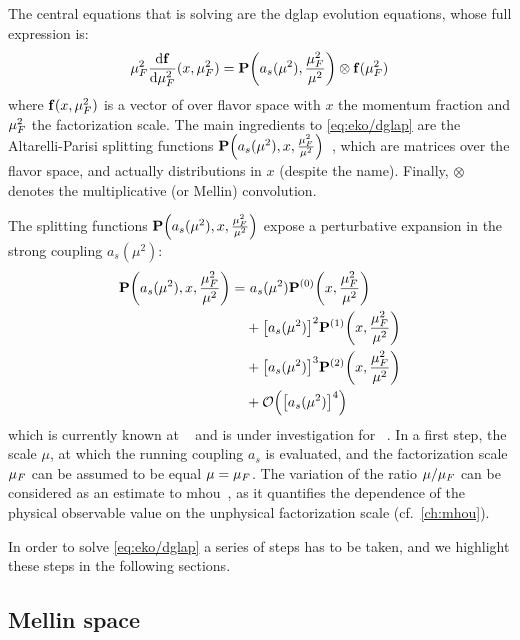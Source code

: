 
The central equations that \eko is solving are the \acrfull{dglap} evolution
equations, whose full expression is:
\begin{equation}
  \muF^2 \dv{\vb f}{\muF^2}{}(x,\muF^2) = \vb P\qty(a_s(\mu^2),\frac{\muF^2}{\mu^2}) \otimes \vb f(\muF^2)
	\label{eq:eko/dglap}
\end{equation}
where $\vb f(x,\mu_F^2)$ is a vector of \pdfs over flavor space with $x$ the
momentum fraction and $\mu_F^2$ the factorization scale. The main ingredients to
\cref{eq:eko/dglap} are the Altarelli-Parisi splitting functions $\vb
P\qty(a_s(\mu^2),x,\frac{\mu_F^2}{\mu^2})$~\cite{Moch:2004pa,Vogt:2004mw}, which
are matrices over the flavor space, and actually distributions in $x$ (despite
the name).
Finally, $\otimes$ denotes the multiplicative (or Mellin) convolution.

The splitting functions $\vb P\qty(a_s(\mu^2),x,\frac{\mu_F^2}{\mu^2})$ expose a
perturbative expansion in the strong coupling $a_s(\mu^2)$:
\begin{align}
  \vb P\qty(a_s(\mu^2),x,\frac{\muF^2}{\mu^2}) =
  &~ a_s(\mu^2) \vb P^{(0)}\qty(x,\frac{\muF^2}{\mu^2})\nonumber\\
  &+ \qty[a_s(\mu^2)]^2 \vb P^{(1)}\qty(x,\frac{\muF^2}{\mu^2})\nonumber\\
  &+ \qty[a_s(\mu^2)]^3 \vb P^{(2)}\qty(x,\frac{\muF^2}{\mu^2})\nonumber\\
  &+ \order{\qty[a_s(\mu^2)]^4}
\end{align}
which is currently known at \nnlo{}~\cite{Moch:2004pa,Vogt:2004mw,Blumlein:2021enk} and is under
investigation for \nnnlo{}~\cite{Moch:2021qrk}.
In a first step, the scale $\mu$, at which the running coupling $a_s$ is
evaluated, and the factorization scale $\mu_F$ can be assumed to be equal $\mu =
\mu_F$.
The variation of the ratio $\mu/\mu_F$ can be considered as an estimate to
\acrfull{mhou}~\cite{AbdulKhalek:2019ihb}, as it quantifies the dependence of
the physical observable value on the unphysical factorization scale (cf.\
\cref{ch:mhou}).

In order to solve \cref{eq:eko/dglap} a series of steps has to be taken, and we
highlight these steps in the following sections.

\subsection{Mellin space}
\label{sec:eko/theory-mellin}


